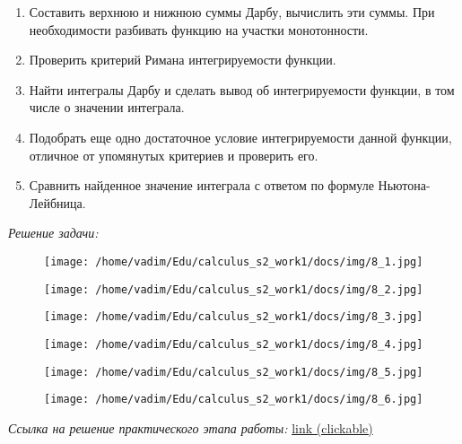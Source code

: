 \documentclass[a4paper,12pt]{article}
\begin{document}
\begin{enumerate}
    \item Составить верхнюю и нижнюю суммы Дарбу, вычислить эти суммы. При необходимости разбивать функцию на участки монотонности.
    
    \item Проверить критерий Римана интегрируемости функции.
    
    \item Найти интегралы Дарбу и сделать вывод об интегрируемости функции, в том числе о значении интеграла.
    
    \item Подобрать еще одно достаточное условие интегрируемости данной функции, отличное от упомянутых критериев и проверить его.
    
    \item Сравнить найденное значение интеграла с ответом по формуле Ньютона-Лейбница.
\end{enumerate}


\emph{Решение задачи:}

\begin{figure}[H]
    \centering
    \texttt{[image: /home/vadim/Edu/calculus\_s2\_work1/docs/img/8\_1.jpg]}
    \label{fig:integral}
\end{figure}

\begin{figure}[H]
    \centering
    \texttt{[image: /home/vadim/Edu/calculus\_s2\_work1/docs/img/8\_2.jpg]}
    \label{fig:integral}
\end{figure}

\begin{figure}[H]
    \centering
    \texttt{[image: /home/vadim/Edu/calculus\_s2\_work1/docs/img/8\_3.jpg]}
    \label{fig:integral}
\end{figure}

\begin{figure}[H]
    \centering
    \texttt{[image: /home/vadim/Edu/calculus\_s2\_work1/docs/img/8\_4.jpg]}
    \label{fig:integral}
\end{figure}

\begin{figure}[H]
    \centering
    \texttt{[image: /home/vadim/Edu/calculus\_s2\_work1/docs/img/8\_5.jpg]}
    \label{fig:integral}
\end{figure}

\begin{figure}[H]
    \centering
    \texttt{[image: /home/vadim/Edu/calculus\_s2\_work1/docs/img/8\_6.jpg]}
    \label{fig:integral}
\end{figure}

\emph{Ссылка на решение практического этапа работы:}
\href{https://github.com/VTiganov/calculus_s2_work1/blob/main/src/task8/main.ipynb}{link (clickable)}
\end{document}
